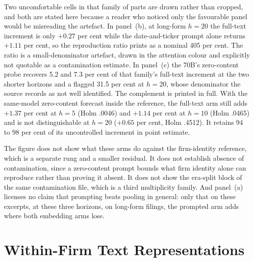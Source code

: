 Two uncomfortable cells in that family of parts are drawn rather than cropped, and
both are stated here because a reader who noticed only the favourable panel
would be misreading the artefact. In panel~(b), at long-form $h=20$ the
full-text increment is only $+0.27$ per cent while the date-and-ticker prompt
alone returns $+1.11$ per cent, so the reproduction ratio prints as a nominal
405 per cent. %
The ratio is a small-denominator artefact, drawn in the attention colour
and explicitly not quotable as a contamination estimate.
In panel~(c) the 70B's zero-content probe recovers 5.2 and 7.3 per cent of
that family's full-text increment at the two shorter horizons and a flagged
31.5 per cent at $h=20$, whose denominator the source records as not well
identified. %
The complement is printed in full. With the same-model zero-content forecast
inside the reference, the full-text arm still adds $+1.37$ per cent at $h=5$
(Holm .0046) and $+1.14$ per cent at $h=10$ (Holm .0465) and is not
distinguishable at $h=20$ ($+0.65$ per cent, Holm .4512). It retains 94 to 98
per cent of its uncontrolled increment in point estimate. %

The figure does not show what these arms do against the firm-identity
reference, which is a separate rung and a smaller residual. It does not
establish absence of contamination, since a zero-content prompt bounds what
firm identity alone can reproduce rather than proving it absent. It does not
show the era-split block of the same contamination file, which is a third
multiplicity family. And panel~(a) licenses no claim that prompting beats
pooling in general: only that on these excerpts, at these three horizons,
on long-form filings, the prompted arm adds where both embedding arms lose.

\FloatBarrier
\section{Within-Firm Text Representations}
\label{app:res-withinfirm}

